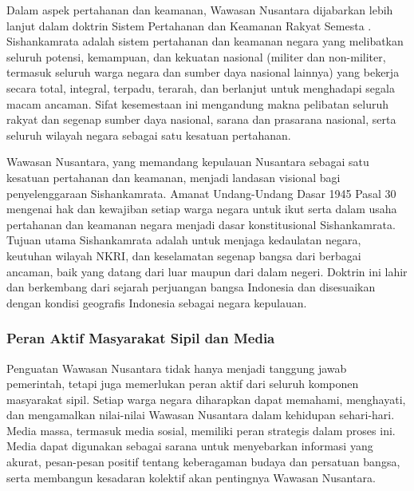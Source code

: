 \documentclass[12pt, a4paper]{article}
\begin{document}
Dalam aspek pertahanan dan keamanan, Wawasan Nusantara dijabarkan lebih lanjut dalam doktrin Sistem Pertahanan dan Keamanan Rakyat Semesta \cite{SISHANKAMRATA}. Sishankamrata adalah sistem pertahanan dan keamanan negara yang melibatkan seluruh potensi, kemampuan, dan kekuatan nasional (militer dan non-militer, termasuk seluruh warga negara dan sumber daya nasional lainnya) yang bekerja secara total, integral, terpadu, terarah, dan berlanjut untuk menghadapi segala macam ancaman. Sifat kesemestaan ini mengandung makna pelibatan seluruh rakyat dan segenap sumber daya nasional, sarana dan prasarana nasional, serta seluruh wilayah negara sebagai satu kesatuan pertahanan.  

Wawasan Nusantara, yang memandang kepulauan Nusantara sebagai satu kesatuan pertahanan dan keamanan, menjadi landasan visional bagi penyelenggaraan Sishankamrata. Amanat Undang-Undang Dasar 1945 Pasal 30 mengenai hak dan kewajiban setiap warga negara untuk ikut serta dalam usaha pertahanan dan keamanan negara menjadi dasar konstitusional Sishankamrata. Tujuan utama Sishankamrata adalah untuk menjaga kedaulatan negara, keutuhan wilayah NKRI, dan keselamatan segenap bangsa dari berbagai ancaman, baik yang datang dari luar maupun dari dalam negeri. Doktrin ini lahir dan berkembang dari sejarah perjuangan bangsa Indonesia dan disesuaikan dengan kondisi geografis Indonesia sebagai negara kepulauan.  

\subsubsection*{Peran Aktif Masyarakat Sipil dan Media}

Penguatan Wawasan Nusantara tidak hanya menjadi tanggung jawab pemerintah, tetapi juga memerlukan peran aktif dari seluruh komponen masyarakat sipil. Setiap warga negara diharapkan dapat memahami, menghayati, dan mengamalkan nilai-nilai Wawasan Nusantara dalam kehidupan sehari-hari. Media massa, termasuk media sosial, memiliki peran strategis dalam proses ini. Media dapat digunakan sebagai sarana untuk menyebarkan informasi yang akurat, pesan-pesan positif tentang keberagaman budaya dan persatuan bangsa, serta membangun kesadaran kolektif akan pentingnya Wawasan Nusantara.  
\end{document}
